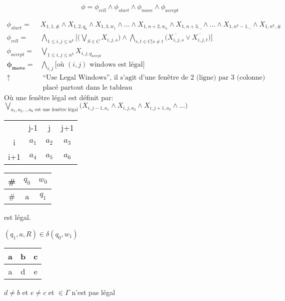 \documentclass[a4paper,12pt]{article}
\begin{document}
    $$\phi = \phi_{cell} \wedge \phi_{start} \wedge \phi_{move} \wedge \phi_{accept}$$
    
    \begin{align*}
      \phi_{start} =& X_{1, 1, \#} \wedge X_{1, 2, q_0} \wedge X_{1, 3, w_1} \wedge ... \wedge X_{1, n+2, w_n} \wedge X_{1, n+3, \_} \wedge ... \wedge X_{1, n^k-1, \_} \wedge X_{1, n^k, \#}\\
      \phi_{cell} =& \bigwedge\limits_{1 \leq i, j \leq n^k} \Big[ \big(\bigvee\limits_{S \in C} X_{i, j, s} \big) \wedge \bigwedge\limits_{s, t \in C | s \neq t} \big( \overline{X_{i, j, s}} \vee \overline{X_{i, j, t}} \big) \Big]\\
      \phi_{accept} =& \bigvee\limits_{1 \leq i, j \leq n^k} X_{i, j, q_{accept}}\\
      \mathbf{\phi_{move}} =& \bigwedge\limits_{i,j} \Big[\text{où }(i,j) \text{ windows est légal} \Big]\\
      \uparrow &\text{ ``Use Legal Windows'', il s'agit d'une fenêtre de 2 (ligne) par 3 (colonne)}\\
      &\text{ placé partout dans le tableau}
    \end{align*}
    Où une fenêtre légal est définit par:\\
    $\bigvee\limits_{a_1, a_2, ... a_6 \text{ est une fenêtre légal}} \big(X_{i, j-1, a_1} \wedge X_{i, j, a_2} \wedge X_{i, j+1, a_3} \wedge ... \big)$
    
    \begin{table}[h]
      \centering
      \begin{tabular}{cccc}
			      & j-1                       & j                         & j+1                       \\ \cline{2-4} 
      \multicolumn{1}{c|}{i}   & \multicolumn{1}{c|}{$a_1$} & \multicolumn{1}{c|}{$a_2$} & \multicolumn{1}{c|}{$a_3$} \\ \cline{2-4} 
      \multicolumn{1}{c|}{i+1} & \multicolumn{1}{c|}{$a_4$} & \multicolumn{1}{c|}{$a_5$} & \multicolumn{1}{c|}{$a_6$} \\ \cline{2-4} 
      \end{tabular}
    \end{table}
    
    \begin{table}[h]
      \centering
      \begin{tabular}{|c|c|c|}
      \hline
      \# & $q_0$ & $w_0$ \\ \hline
      \# & a    & $q_1$ \\ \hline
      \end{tabular}
    \end{table}
    est légal.
    
    $(q_1, a, R) \in \delta(q_0, w_1)$
    
    \begin{table}[h]
      \centering
      \begin{tabular}{|c|c|c|}
      \hline
      a & b & c \\ \hline
      a & d & e \\ \hline
      \end{tabular}
    \end{table}
    $d \neq b$ et $e \neq c$ et $\in \Gamma$ n'est pas légal
    
  
\end{document}
